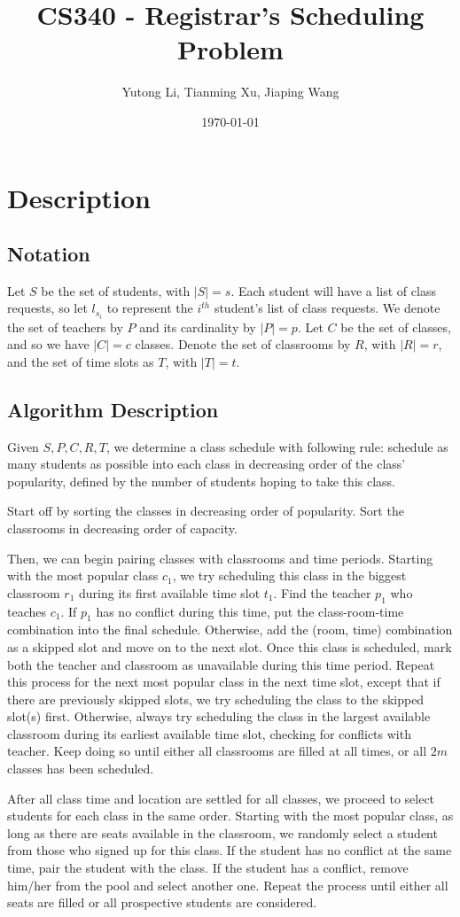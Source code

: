 \documentclass[11pt, oneside]{article}   	%
\title{CS340 - Registrar's Scheduling Problem}
\author{Yutong Li, Tianming Xu, Jiaping Wang}
\date{\today}							%
\begin{document}
\maketitle

\section{Description}
\subsection{Notation}
Let $S$ be the set of students, with $|S|=s$. Each student will have a list of class requests, so let $l_{s_i}$ to represent the $i^{th}$ student's list of class requests. We denote the set of teachers by $P$ and its cardinality by $|P|=p$. Let $C$ be the set of classes, and so we have $|C|=c$ classes. Denote the set of classrooms by $R$, with $|R|=r$, and the set of time slots as $T$, with $|T|=t$. 
\subsection{Algorithm Description}
Given $S, P, C, R, T$, we determine a class schedule with following rule: schedule as many students as possible into each class in decreasing order of the class' popularity, defined by the number of students hoping to take this class. \par 
Start off by sorting the classes in decreasing order of popularity. Sort the classrooms in decreasing order of capacity. \par
Then, we can begin pairing classes with classrooms and time periods. Starting with the most popular class $c_1$, we try scheduling this class in the biggest classroom $r_1$ during its first available time slot $t_1$. Find the teacher $p_1$ who teaches $c_1$. If $p_1$ has no conflict during this time, put the class-room-time combination into the final schedule. Otherwise, add the (room, time) combination as a skipped slot and move on to the next slot. Once this class is scheduled, mark both the teacher and classroom as unavailable during this time period. Repeat this process for the next most popular class in the next time slot, except that if there are previously skipped slots, we try scheduling the class to the skipped slot(s) first. Otherwise, always try scheduling the class in the largest available classroom during its earliest available time slot, checking for conflicts with teacher. Keep doing so until either all classrooms are filled at all times, or all $2m$ classes has been scheduled.\par
After all class time and location are settled for all classes, we proceed to select students for each class in the same order. Starting with the most popular class, as long as there are seats available in the classroom, we randomly select a student from those who signed up for this class. If the student has no conflict at the same time, pair the student with the class. If the student has a conflict, remove him/her from the pool and select another one. Repeat the process until either all seats are filled or all prospective students are considered.
\end{document}
